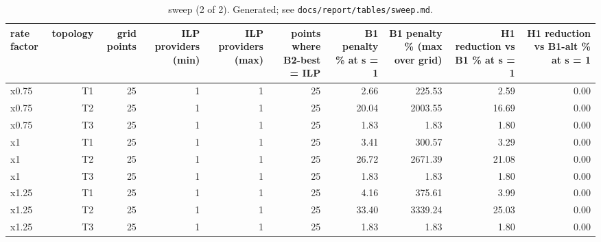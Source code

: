 \begin{table}[t]
\centering
\small
\begin{tabular}{lrrrrrrrrr}
\toprule
rate factor & topology & grid points & ILP providers (min) & ILP providers (max) & points where B2-best = ILP & B1 penalty \% at s = 1 & B1 penalty \% (max over grid) & H1 reduction vs B1 \% at s = 1 & H1 reduction vs B1-alt \% at s = 1 \\
\midrule
x0.75 & T1 & 25 & 1 & 1 & 25 & 2.66 & 225.53 & 2.59 & 0.00 \\
x0.75 & T2 & 25 & 1 & 1 & 25 & 20.04 & 2003.55 & 16.69 & 0.00 \\
x0.75 & T3 & 25 & 1 & 1 & 25 & 1.83 & 1.83 & 1.80 & 0.00 \\
x1 & T1 & 25 & 1 & 1 & 25 & 3.41 & 300.57 & 3.29 & 0.00 \\
x1 & T2 & 25 & 1 & 1 & 25 & 26.72 & 2671.39 & 21.08 & 0.00 \\
x1 & T3 & 25 & 1 & 1 & 25 & 1.83 & 1.83 & 1.80 & 0.00 \\
x1.25 & T1 & 25 & 1 & 1 & 25 & 4.16 & 375.61 & 3.99 & 0.00 \\
x1.25 & T2 & 25 & 1 & 1 & 25 & 33.40 & 3339.24 & 25.03 & 0.00 \\
x1.25 & T3 & 25 & 1 & 1 & 25 & 1.83 & 1.83 & 1.80 & 0.00 \\
\bottomrule
\end{tabular}
\caption{sweep (2 of 2). Generated; see \texttt{docs/report/tables/sweep.md}.}
\label{tab:sweep-2}
\end{table}
